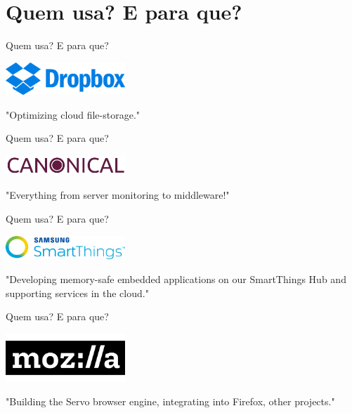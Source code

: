 \documentclass[aspectratio=169]{beamer}
\begin{document}
\section{Quem usa? E para que?}

\begin{frame}{Quem usa? E para que?}
	\begin{center}
		\includegraphics[width=4.5cm]{imgs/dropbox.png}	
		
		"Optimizing cloud file-storage."
	\end{center}
\end{frame}

\begin{frame}[noframenumbering]{Quem usa? E para que?}
	\begin{center}
		\includegraphics[width=4.5cm]{imgs/canonical.jpeg}	
		
		"Everything from server monitoring to middleware!"
	\end{center}
\end{frame}

\begin{frame}[noframenumbering]{Quem usa? E para que?}
	\begin{center}
		\includegraphics[width=4.5cm]{imgs/smartthings.png}	
		
		"Developing memory-safe embedded applications on our SmartThings Hub and supporting services in the cloud."
	\end{center}
\end{frame}

\begin{frame}[noframenumbering]{Quem usa? E para que?}
	\begin{center}
		\includegraphics[width=4.5cm]{imgs/mozilla.png}	
		
		"Building the Servo browser engine, integrating into Firefox, other projects."
	\end{center}
\end{frame}
\end{document}

